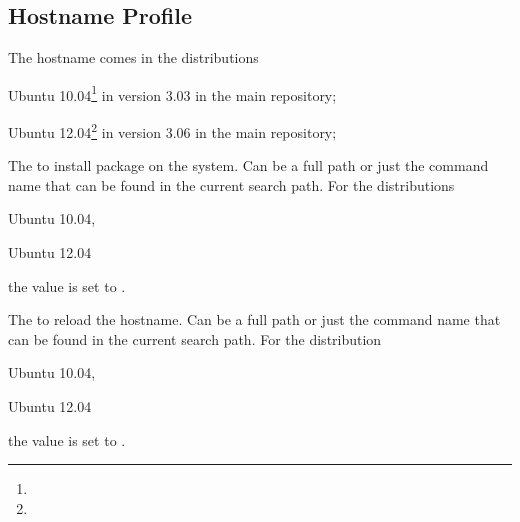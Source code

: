 \subsection{Hostname Profile}

The hostname comes in the distributions 
\begin{compactitem}
\item[\TheDistribution{ubuntu}] Ubuntu 10.04\footnote{\TheUbuntuMaverickLTSDate} in version 3.03 in the main repository;
\item[\TheDistribution{ubuntu}] Ubuntu 12.04\footnote{\TheUbuntuPreciseLTSDate} in version 3.06 in the main repository;
\end{compactitem}


The  to install package on the system. Can be a full path or
just the command name that can be found in the current search path. 
For the distributions 
\begin{inparaitem}
\item[\TheDistribution{ubuntu}] Ubuntu 10.04,
\item[\TheDistribution{ubuntu}] Ubuntu 12.04
\end{inparaitem}
the value is set to .


The  to reload the hostname. Can be a full path or
just the command name that can be found in the current search path.
For the distribution
\begin{inparaitem}
\item[\TheDistribution{ubuntu}] Ubuntu 10.04,
\item[\TheDistribution{ubuntu}] Ubuntu 12.04
\end{inparaitem}
the value is set to .


